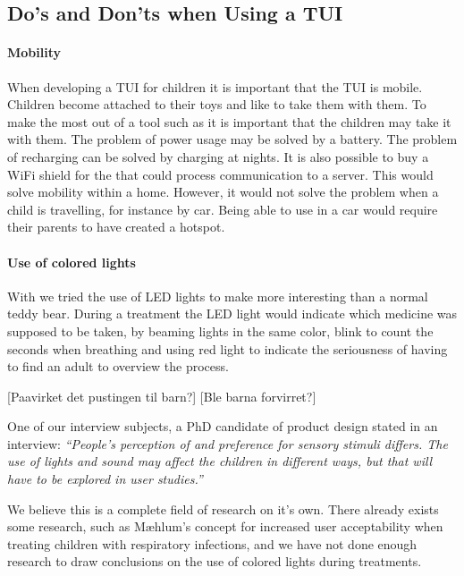 \subsection{Do's and Don'ts when Using a TUI}
\label{sec:dosanddontsfortui}

\paragraph{Mobility}
When developing a TUI for children it is important that the TUI is mobile. Children become attached to their toys and like to take them with them. To make the most out of a tool such as \buddy{} it is important that the children may take it with them. The problem of power usage may be solved by a battery. The problem of recharging can be solved by charging at nights. It is also possible to buy a WiFi shield for the \rpi{} that could process communication to a server. This would solve mobility within a home. However, it would not solve the problem when a child is travelling, for instance by car. Being able to use \ab{} in a car would require their parents to have created a hotspot.   

\paragraph{Use of colored lights}
With \buddy{} we tried the use of LED lights to make \buddy{} more interesting than a normal teddy bear. During a treatment the LED light would indicate which medicine was supposed to be taken, by beaming lights in the same color, blink to count the seconds when breathing and using red light to indicate the seriousness of having to find an adult to overview the process. 

[Paavirket det pustingen til barn?]
[Ble barna forvirret?]

One of our interview subjects, a PhD candidate of product design stated in an interview: 
\textit{``People's perception of and preference for sensory stimuli differs. The use of lights and sound may affect the children in different ways, but that will have to be explored in user studies.''} 

We believe this is a complete field of research on it's own. There already exists some research, such as M\ae hlum's concept for increased user acceptability when treating children with respiratory infections\cite{mahlum2013}, and we have not done enough research to draw conclusions on the use of colored lights during treatments. 


